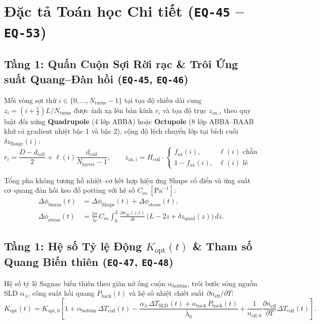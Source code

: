 \documentclass[11pt, a4paper]{article}
\begin{document}
\section{Đặc tả Toán học Chi tiết (\texttt{EQ-45} -- \texttt{EQ-53})}

\subsection{Tầng 1: Quấn Cuộn Sợi Rời rạc \& Trôi Ứng suất Quang--Đàn hồi (\texttt{EQ-45}, \texttt{EQ-46})}

Mỗi vòng sợi thứ $i \in \{0, \dots, N_{\text{turns}}-1\}$ tại tọa độ chiều dài cung $z_i = (i + \tfrac{1}{2})L / N_{\text{turns}}$ được ánh xạ lên bán kính $r_i$ và tọa độ trục $z_{\text{ax},i}$ theo quy luật đối xứng \textbf{Quadrupole} (4 lớp ABBA) hoặc \textbf{Octupole} (8 lớp ABBA--BAAB khử cả gradient nhiệt bậc 1 và bậc 2), cộng độ lệch chuyển lớp tại bích cuối $\delta z_{\text{flange}}(i)$:
\begin{equation}
r_i = \frac{D - d_{\text{coil}}}{2} + \ell(i)\frac{d_{\text{coil}}}{N_{\text{layers}} - 1}, \qquad
z_{\text{ax},i} = H_{\text{coil}} \cdot \begin{cases} f_{\text{ax}}(i), & \ell(i)\text{ chẵn} \\ 1 - f_{\text{ax}}(i), & \ell(i)\text{ lẻ} \end{cases}
\tag{EQ-45}
\end{equation}

Tổng pha không tương hỗ nhiệt--cơ kết hợp hiệu ứng Shupe cổ điển và ứng suất cơ--quang đàn hồi keo đổ potting với hệ số $C_{\text{eo}}\;[\text{Pa}^{-1}]$:
\begin{align}
\Delta\phi_{\text{therm}}(t) &= \Delta\phi_{\text{Shupe}}(t) + \Delta\phi_{\text{stress}}(t), \\
\Delta\phi_{\text{stress}}(t) &= \frac{2\pi}{\bar{\lambda} c}\,C_{\text{eo}} \int_0^L \frac{\partial \sigma_{\text{eff}}(z, t)}{\partial t}\,\big(L - 2z + \delta z_{\text{quad}}(z)\big)\,dz.
\tag{EQ-46}
\end{align}

\subsection{Tầng 1: Hệ số Tỷ lệ Động $K_{\text{opt}}(t)$ \& Tham số Quang Biến thiên (\texttt{EQ-47}, \texttt{EQ-48})}

Hệ số tỷ lệ Sagnac biến thiên theo giãn nở ống cuộn $\alpha_{\text{bobbin}}$, trôi bước sóng nguồn SLD $\alpha_\lambda$, công suất hồi quang $P_{\text{back}}(t)$ và hệ số nhiệt chiết suất $\partial n_{\text{eff}}/\partial T$:
\begin{equation}
K_{\text{opt}}(t) = K_{\text{opt},0} \left[ 1 + \alpha_{\text{bobbin}}\,\Delta T_{\text{coil}}(t) - \frac{\alpha_{\lambda}\,\Delta T_{\text{SLD}}(t) + \kappa_{\text{back}}\,P_{\text{back}}(t)}{\bar{\lambda}_0} + \frac{1}{n_{\text{eff},0}}\frac{\partial n_{\text{eff}}}{\partial T}\Delta T_{\text{coil}}(t) \right].
\tag{EQ-47}
\end{equation}
\end{document}
